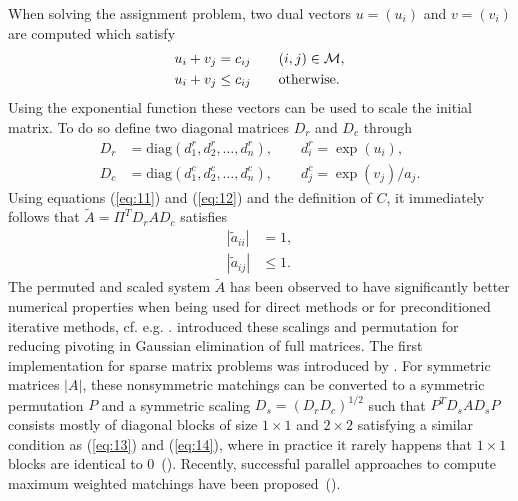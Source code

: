 When solving the assignment problem, two dual vectors $u = (u_i)$ and
$v = (v_i)$ are computed which satisfy
\begin{align}
  u_i + v_j & = c_{ij} \qquad  (i,j) \in \mathcal{M}, \label{eq:11} \\
  u_i + v_j & \leq c_{ij} \qquad \text{otherwise}. \label{eq:12}
\end{align}
Using the exponential function these vectors can be used to scale the 
initial matrix. To do so define
two diagonal matrices $D_r$ and $D_c$ through
\begin{align}
  D_r & = \text{diag}(d_1^r,d_2^r,\dots,d_n^r), \qquad d_i^r = \exp(u_i),\\ 
  D_c & = \text{diag}(d_1^c,d_2^c,\dots,d_n^c), \qquad d_j^c = \exp(v_j)/a_j.
\end{align}
Using equations (\ref{eq:11}) and (\ref{eq:12}) and the definition of $C$, 
it immediately follows that $\tilde A = \Pi^T D_r A D_c$ satisfies
\begin{align}
  |\tilde a_{ii}| & = 1, \label{eq:13}\\
  |\tilde a_{ij}| & \le 1. \label{eq:14}
\end{align}
The permuted and scaled system $\tilde A$ has been observed to
have significantly better numerical properties when being used
for direct methods or for preconditioned iterative methods, cf. e.g. 
\cite{benzi:2000:phi,DufK99S}. \cite{olschowka:1996} introduced these scalings and
permutation for reducing pivoting in Gaussian elimination of full
matrices. The first implementation for sparse matrix problems was
introduced by \cite{DufK99S}. For symmetric
matrices $|A|$, these nonsymmetric matchings can be converted
to a symmetric permutation $P$ and a symmetric scaling $D_s=(D_rD_c)^{1/2}$
such that $P^TD_sAD_sP$ consists mostly of diagonal blocks of size $1\times 1$
and $2\times 2$ satisfying a similar condition as (\ref{eq:13}) and (\ref{eq:14}),
where in practice it rarely happens that  $1\times 1$ blocks are identical 
to $0$~(\cite{dupr:04a}).
Recently, successful parallel approaches to compute maximum weighted matchings have
been proposed~(\cite{LanPM11,LanAM14}).

